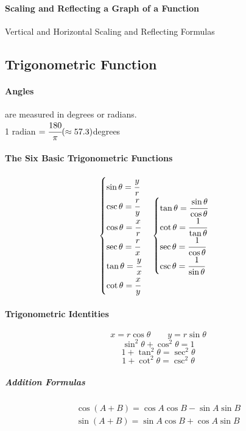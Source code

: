 \documentclass{article}
\begin{document}
            \paragraph{Scaling and Reflecting a Graph of a Function}
            Vertical and Horizontal Scaling and Reflecting Formulas
        \subsection{Trigonometric Function}

            \paragraph{Angles} are measured in degrees or radians.\\
            1 radian $= \cfrac{180}{\pi} (\approx 57.3)$degrees
            
            \paragraph{The Six Basic Trigonometric Functions}
            \begin{equation}
                \begin{cases}
                    \sin \theta=\cfrac{y}{r}\\
                    \csc \theta=\cfrac{r}{y}\\
                    \cos \theta=\cfrac{x}{r}\\
                    \sec \theta=\cfrac{r}{x}\\
                    \tan \theta=\cfrac{y}{x}\\
                    \cot \theta=\cfrac{x}{y}
                \end{cases}    
                \begin{cases}
                    \tan \theta=\cfrac{\sin \theta}{\cos \theta}\\
                    \cot \theta=\cfrac{1}{\tan \theta}\\
                    \sec \theta=\cfrac{1}{\cos \theta}\\
                    \csc \theta=\cfrac{1}{\sin \theta}
                \end{cases}
            \end{equation}
            \paragraph{Trigonometric Identities}
            \[x=r\cos \theta \qquad y=r\sin \theta\]
            \[\sin ^2 \theta + \cos ^2 \theta =1\]
            \[1+ \tan ^2 \theta = \sec ^2 \theta\]
            \[1+ \cot ^2 \theta = \csc ^2 \theta\]
            \subparagraph{Addition Formulas}
            \begin{equation}
                \begin{aligned}
                    \cos (A+B)=\cos A \cos B- \sin A \sin B\\
                    \sin (A+B)=\sin A \cos B+ \cos A \sin B
                \end{aligned}
            \end{equation}
            
\end{document}
